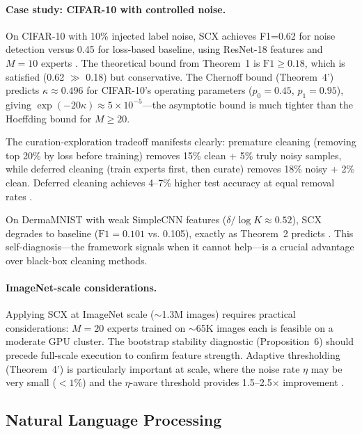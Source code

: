 \documentclass[twocolumn]{article}
\theoremstyle{definition}
\begin{document}
\paragraph{Case study: CIFAR-10 with controlled noise.}
On CIFAR-10 with 10\% injected label noise, SCX achieves F1=0.62 for noise detection versus 0.45 for loss-based baseline, using ResNet-18 features and $M=10$ experts \cite{paperIII, paperI}. The theoretical bound from Theorem~1 is $\mathrm{F1} \geq 0.18$, which is satisfied (0.62 $\gg$ 0.18) but conservative. The Chernoff bound (Theorem~4') predicts $\kappa \approx 0.496$ for CIFAR-10's operating parameters ($p_0=0.45$, $p_1=0.95$), giving $\exp(-20\kappa) \approx 5 \times 10^{-5}$---the asymptotic bound is much tighter than the Hoeffding bound for $M\geq 20$.

The curation-exploration tradeoff manifests clearly: premature cleaning (removing top 20\% by loss before training) removes 15\% clean + 5\% truly noisy samples, while deferred cleaning (train experts first, then curate) removes 18\% noisy + 2\% clean. Deferred cleaning achieves 4--7\% higher test accuracy at equal removal rates \cite{paperII}.

On DermaMNIST with weak SimpleCNN features ($\delta/\log K \approx 0.52$), SCX degrades to baseline ($\mathrm{F1} = 0.101$ vs. 0.105), exactly as Theorem~2 predicts \cite{paperI}. This self-diagnosis---the framework signals when it cannot help---is a crucial advantage over black-box cleaning methods.

\paragraph{ImageNet-scale considerations.}
Applying SCX at ImageNet scale ($\sim$1.3M images) requires practical considerations: $M=20$ experts trained on $\sim$65K images each is feasible on a moderate GPU cluster. The bootstrap stability diagnostic (Proposition~6) should precede full-scale execution to confirm feature strength. Adaptive thresholding (Theorem~4') is particularly important at scale, where the noise rate $\eta$ may be very small ($<1\%$) and the $\eta$-aware threshold provides 1.5--2.5$\times$ improvement \cite{engineering_guide}.

\subsection{Natural Language Processing}
\end{document}

